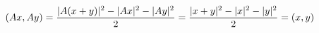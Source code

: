 \documentclass[preview]{standalone}
\begin{document}
\begin{align*}
\special{dvisvgm:raw <g id='unique000'>}(Ax,Ay)=\dfrac{|A(x+y)|^2-|Ax|^2-|Ay|^2}{2}=\dfrac{|x+y|^2-|x|^2-|y|^2}{2}=(x,y)\special{dvisvgm:raw </g>}
\end{align*}
\end{document}
